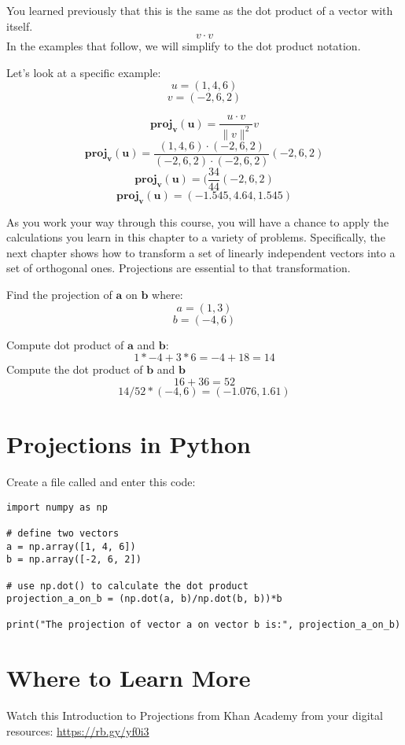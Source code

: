 You learned previously that this is the same as the dot product of a vector with itself.
$${v\cdot v}$$
In the examples that follow, we will simplify to the dot product notation.

Let's look at a specific example:
$$u = (1,4,6)$$ 
$$v = (-2,6,2)$$ 

$$\mathbf{proj}_\mathbf{v}(\mathbf{u}) = \frac{u\cdot v}{\parallel {v}\parallel ^2}v$$
$$\mathbf{proj}_\mathbf{v}(\mathbf{u}) = \frac{(1,4,6)\cdot(-2,6,2)}{ (-2,6,2)\cdot (-2,6,2)}(-2,6,2)$$
$$\mathbf{proj}_\mathbf{v}(\mathbf{u}) = (\frac{34}{44}(-2,6,2)$$
$$\mathbf{proj}_\mathbf{v}(\mathbf{u}) = (-1.545, 4.64, 1.545)$$

As you work your way through this course, you will have a chance to apply the calculations you learn in this chapter to a variety of problems. Specifically, the next chapter shows how to transform a set of linearly independent vectors into a set of orthogonal ones. Projections are essential to that transformation. 

\begin{Exercise}[title={Projections}, label=projections]
	Find the projection of $\mathbf{a}$ on $\mathbf{b}$ where:
	$$a = (1,3)$$
	$$b = (-4,6)$$
\end{Exercise}
\begin{Answer}[ref=projections]
	Compute dot product of $\mathbf{a}$ and $\mathbf{b}$:
	$$1*-4 + 3*6 = -4 +18 = 14$$
	Compute the dot product of $\mathbf{b}$ and $\mathbf{b}$
	$$16 + 36 = 52 $$
	$$14/52 * (-4,6) = (-1.076 , 1.61)$$
\end{Answer}
 
\section{Projections in Python}

Create a file called  and enter this code:
\begin{Verbatim}
import numpy as np

# define two vectors  
a = np.array([1, 4, 6])   
b = np.array([-2, 6, 2])  
  
# use np.dot() to calculate the dot product
projection_a_on_b = (np.dot(a, b)/np.dot(b, b))*b
  
print("The projection of vector a on vector b is:", projection_a_on_b)
\end{Verbatim}
 
\section{Where to Learn More}

Watch this Introduction to Projections from Khan Academy from your digital resources:
\url{https://rb.gy/yf0i3}

